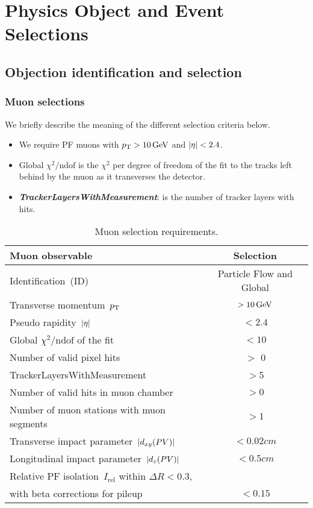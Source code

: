 \chapter{Physics Object and Event Selections}
\label{chap:PhysicsObjectEventSelections}


\section{Objection identification and selection}
\label{sec:ObjectionIdentificationSelection}


\subsection{Muon selections}
\label{sec:MuonSelections}


We briefly describe the meaning of the different selection criteria below.
\begin{itemize}
\item We require PF muons with $p_{\mathrm{T}} > 10\,\text{Ge\hspace{-.08em}V}$ and $\lvert \eta \rvert < 2.4$.
\item Global $\chi^{2}/\textrm{ndof}$ is the $\chi^{2}$ per degree of freedom of the 
fit to the tracks left behind by the muon as it transverses the detector.
\item \textbf{\textit{TrackerLayersWithMeasurement}}: is the number of tracker layers with hits.
\end{itemize}


\begin{table*}[!hbtp]
\centering
\caption{Muon selection requirements.}
\label{tab:MuonSelections}
\begin{tabular}{l|c}
\hline \hline
Muon observable & Selection \\
\hline \hline
Identification~(ID) & Particle Flow and Global \\
Transverse momentum~$p_{\mathrm{T}}$ & $> 10\,\text{Ge\hspace{-.08em}V}$ \\
Pseudo rapidity~$\lvert \eta \rvert$ & $< 2.4$ \\
Global $\chi^{2}/\textrm{ndof}$ of the fit & $< 10$  \\
Number of valid pixel hits & $>$ 0 \\
TrackerLayersWithMeasurement & $>$5 \\
Number of valid hits in muon chamber & $> 0$ \\
Number of muon stations with muon segments & $> 1$ \\
Transverse impact parameter~$\lvert d_{xy}(PV) \rvert$ & $< 0.02\unit{cm}$ \\
Longitudinal impact parameter~$\lvert d_{z}(PV) \rvert$ & $< 0.5\unit{cm}$ \\
Relative PF isolation~$I_{\textrm{rel}}$ within $\Delta{R} < 0.3$, & \\
with beta corrections for pileup & $< 0.15$ \\
\hline \hline
\end{tabular}
\end{table*}


